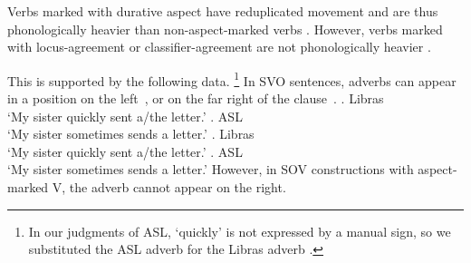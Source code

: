 \documentclass[output=paper]{langscibook}
\begin{document}
Verbs marked with durative aspect have reduplicated movement
\citep{Klima.Bellugi.1979} and are thus phonologically heavier than
non-aspect-marked verbs \citep{Brentari.1998}. However, verbs marked
with lo\-cus-agree\-ment or class\-i\-fier-agree\-ment are not phonologically
heavier \citep{Brentari.1998}.

This is supported by the following data.%
\footnote{%
    In our judgments of ASL, `quickly' is not expressed by a manual sign, so
    we substituted the ASL adverb  for the Libras adverb .
}
In SVO sentences, adverbs can appear in a position on the left~, or on the
far right of the clause~.
\ea 
    \label{lasz:ex:13}
    \ea 
          \textbf{} \laszPlain{} .
        \hfill 
        \cmark Libras
        \\
         ‘My sister quickly sent a/the letter.’
    \ex 
          \textbf{} \laszPlain{} . 
        \hfill 
        \cmark ASL 
        \\ 
        ‘My sister sometimes sends a letter.’
    \z 
\ex 
    \label{lasz:ex:14}
    \ea 
          \laszPlain{}  \textbf{}.
        \hfill 
        \cmark Libras 
        \\ 
        ‘My sister quickly sent a/the letter.’
    \ex 
          \laszPlain{}  \textbf{}.
        \hfill 
        \cmark ASL 
        \\ 
        ‘My sister sometimes sends a letter.’
    \z 
\z 
However, in SOV constructions with aspect-marked V, the adverb
cannot appear on the right.
\ea 
    \label{lasz:ex:15}
    \z 
\ex 
    \label{lasz:ex:16}
\end{document}

